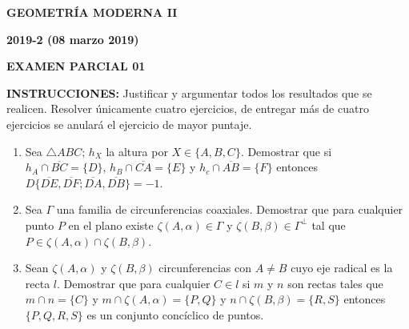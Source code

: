 \documentclass[12pt]{report}
\newcommand{\R}{\mathbb R}
\begin{document}
\begin{center}
\textbf{\LARGE {GEOMETRÍA MODERNA II}}
\end{center}

\begin{center}
\textbf{{\large 2019-2 (08 marzo 2019)}}
\end{center}

\begin{center}
\textbf{{\large EXAMEN PARCIAL 01}}
\end{center}

{\bf INSTRUCCIONES:} Justificar y argumentar todos los resultados que se realicen. Resolver únicamente cuatro ejercicios, de entregar más de cuatro ejercicios se anulará el ejercicio de mayor puntaje.

\begin{enumerate}


\item Sea $\triangle ABC$; $h_X$ la altura por $X \in \{A,B,C\}$. Demostrar que si $h_A \cap \overline{BC}=\{D\}$, $h_B \cap \overline{CA}=\{E\}$ y $h_c \cap \overline{AB}=\{F\}$ entonces $D\{\overline{DE},\overline{DF};\overline{DA},\overline{DB}\} = -1$.


\item Sea $\Gamma$ una familia de circunferencias coaxiales. Demostrar que para cualquier punto $P$ en el plano existe $\zeta(A, \alpha) \in \Gamma$ y $\zeta(B,\beta) \in \Gamma^\bot$ tal que $P \in \zeta(A, \alpha) \cap \zeta(B,\beta)$.
 

\item Sean $\zeta(A,\alpha)$ y $\zeta(B,\beta)$ circunferencias con $A \neq B$ cuyo eje radical es la recta $l$. Demostrar que para cualquier $C \in l$ si $m$ y $n$ son rectas tales que $m \cap n = \{C\}$ y $m \cap \zeta(A, \alpha) = \{P,Q\}$ y $n \cap \zeta(B, \beta) = \{R,S\}$ entonces $\{P,Q,R,S\}$ es un conjunto concíclico de puntos.


\end{enumerate}
\end{document}
